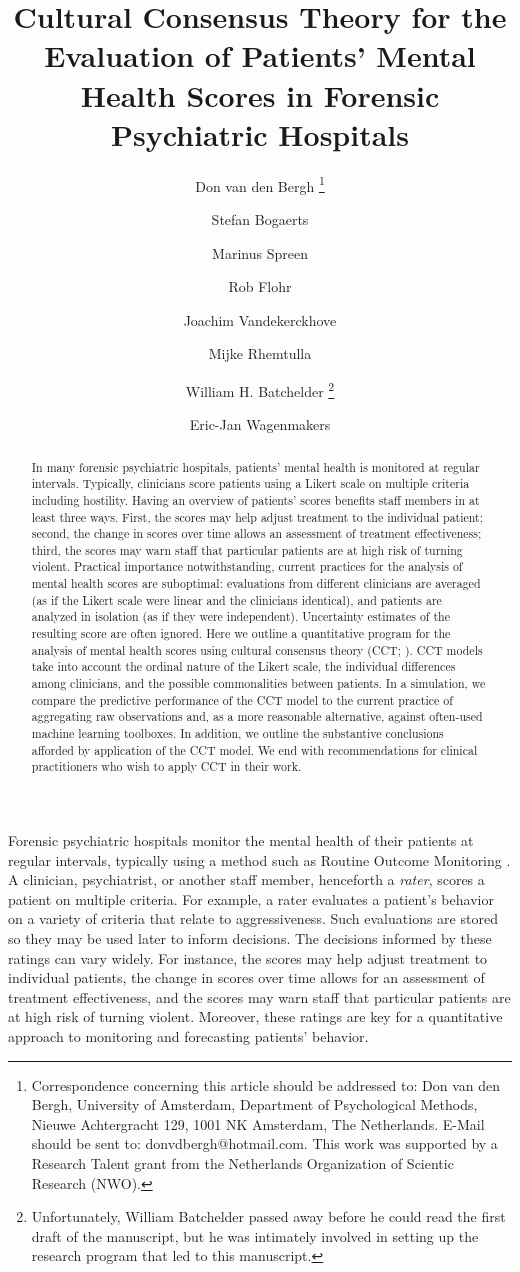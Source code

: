 \documentclass[a4paper,usenames,dvipsnames]{article}
\title{Cultural Consensus Theory for the Evaluation of Patients' Mental Health Scores in Forensic Psychiatric Hospitals}
\author[1]{Don van den Bergh%
\thanks{Correspondence concerning this article should be addressed to: Don van den Bergh, University of Amsterdam, Department of Psychological Methods, Nieuwe Achtergracht 129, 1001 NK Amsterdam, The Netherlands. E-Mail should be sent to: donvdbergh@hotmail.com. This work was supported by a Research Talent grant from the Netherlands Organization of Scientic Research (NWO).
}}
\author[2]{Stefan Bogaerts}
\author[3]{Marinus Spreen}
\author[3]{\authorcr Rob Flohr}
\author[4]{Joachim Vandekerckhove}
\author[5]{Mijke Rhemtulla}
\author[4]{\authorcr William H. Batchelder%
\thanks{Unfortunately, William Batchelder passed away before he could read the first draft of the manuscript, but he was intimately involved in setting up the research program that led to this manuscript.}}
\author[1]{Eric-Jan Wagenmakers}
\affil[1]{University of Amsterdam}
\affil[2]{University of Tilburg}
\affil[3]{NHL Stenden University of Applied Sciences}
\affil[4]{University of California Irvine}
\affil[5]{University of California Davis}
\date{}
\begin{document}

\maketitle

\begin{abstract}
In many forensic psychiatric hospitals, patients' mental health is monitored at regular intervals. Typically, clinicians score patients using a Likert scale on multiple criteria including hostility. Having an overview of patients’ scores benefits staff members in at least three ways. First, the scores may help adjust treatment to the individual patient; second, the change in scores over time allows an assessment of treatment effectiveness; third, the scores may warn staff that particular patients are at high risk of turning violent. Practical importance notwithstanding, current practices for the analysis of mental health scores are suboptimal: evaluations from different clinicians are averaged (as if the Likert scale were linear and the clinicians identical), and patients are analyzed in isolation (as if they were independent). Uncertainty estimates of the resulting score are often ignored. Here we outline a quantitative program for the analysis of mental health scores using cultural consensus theory (CCT; ). CCT models take into account the ordinal nature of the Likert scale, the individual differences among clinicians, and the possible commonalities between patients. In a simulation, we compare the predictive performance of the CCT model to the current practice of aggregating raw observations and, as a more reasonable alternative, against often-used machine learning toolboxes. In addition, we outline the substantive conclusions afforded by application of the CCT model. We end with recommendations for clinical practitioners who wish to apply CCT in their work. 
\end{abstract}
\newpage

Forensic psychiatric hospitals monitor the mental health of their patients at regular intervals, typically using a method such as Routine Outcome Monitoring \cite{deBeurs2011ROM}. A clinician, psychiatrist, or another staff member, henceforth a \textit{rater}, scores a patient on multiple criteria. For example, a rater evaluates a patient's behavior on a variety of criteria that relate to aggressiveness. Such evaluations are stored so they may be used later to inform decisions. The decisions informed by these ratings can vary widely. For instance, the scores may help adjust treatment to individual patients, the change in scores over time allows for an assessment of treatment effectiveness, and the scores may warn staff that particular patients are at high risk of turning violent. Moreover, these ratings are key for a quantitative approach to monitoring and forecasting patients' behavior.
\end{document}
